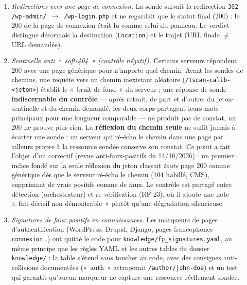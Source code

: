 \documentclass[11pt,a4paper]{report}
\newcommand{\code}[1]{\texttt{#1}}
\begin{document}
\begin{enumerate}[leftmargin=1.8em]
  \item \textit{Redirections vers une page de connexion.} La sonde suivait la redirection
        \code{302 /wp-admin/ $\rightarrow$ /wp-login.php} et ne regardait que le statut
        final (200) : le 200 de la page de connexion était lu comme celui du panneau. Le
        verdict distingue désormais la destination (\code{Location}) et le trajet (URL
        finale $\neq$ URL demandée).
  \item \textit{Sentinelle anti «~soft-404~» (contrôle négatif).} Certains serveurs
        répondent 200 avec une page générique pour n'importe quel chemin. Avant les sondes
        de chemins, une requête vers un chemin inexistant aléatoire
        (\code{/tscan-calib-<jeton>}) établit le «~bruit de fond~» du serveur ; une
        réponse de sonde \textbf{indiscernable du contrôle} --- après retrait, de part et
        d'autre, du jeton-sentinelle et du chemin demandé, les deux corps partagent leurs
        mots principaux pour une longueur comparable --- ne produit pas de constat, un 200
        ne prouve plus rien. La \textbf{réflexion du chemin seule} ne suffit jamais à
        écarter une sonde : un serveur qui ré-écho le chemin dans une page par ailleurs
        propre à la ressource sondée conserve son constat. Ce point a fait l'objet d'un
        correctif (revue anti-faux-positifs du 14/10/2026) : un premier indice fondé sur la
        seule réflexion du jeton classait \emph{toute} page 200 comme générique dès que le
        serveur ré-écho le chemin (404 habillé, CMS), supprimant de vrais positifs comme de
        faux. Le contrôle est partagé entre détection (orchestrateur) et re-vérification
        (RF-23), où il ajoute une note «~fait décisif non démontrable~» plutôt qu'une
        dégradation silencieuse.
  \item \textit{Signatures de faux positifs en connaissances.} Les marqueurs de pages
        d'authentification (WordPress, Drupal, Django, pages francophones
        \code{connexion}\ldots) ont quitté le code pour
        \code{knowledge/fp\_signatures.yaml}, au même principe que les règles YAML et les
        autres tables du dossier \code{knowledge/} : la table s'étend sans toucher au
        code, avec des consignes anti-collisions documentées («~auth~» attraperait
        \code{/author/john-doe}) et un test qui garantit qu'aucun marqueur ne capture une
        ressource réellement sondée.
\end{enumerate}
\end{document}
